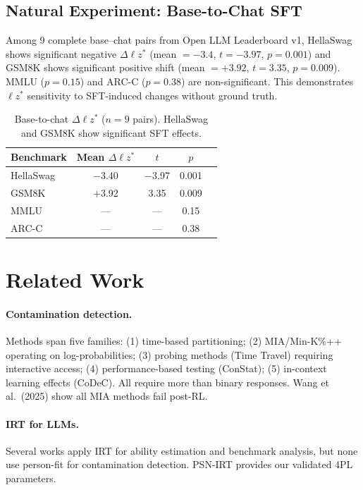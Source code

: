 \documentclass[11pt,a4paper]{article}
\begin{document}
\subsection{Natural Experiment: Base-to-Chat SFT}

Among 9 complete base--chat pairs from Open LLM Leaderboard v1, HellaSwag shows significant negative $\Delta \ell z^*$ (mean $= -3.4$, $t = -3.97$, $p = 0.001$) and GSM8K shows significant positive shift (mean $= +3.92$, $t = 3.35$, $p = 0.009$).
MMLU ($p = 0.15$) and ARC-C ($p = 0.38$) are non-significant.
This demonstrates $\ell z^*$ sensitivity to SFT-induced changes without ground truth.

\begin{table}[h]
\centering
\small
\begin{tabular}{lcccc}
\toprule
Benchmark & Mean $\Delta \ell z^*$ & $t$ & $p$ \\
\midrule
HellaSwag & $-$3.40 & $-$3.97 & 0.001 \\
GSM8K & +3.92 & 3.35 & 0.009 \\
MMLU & --- & --- & 0.15 \\
ARC-C & --- & --- & 0.38 \\
\bottomrule
\end{tabular}
\caption{Base-to-chat $\Delta \ell z^*$ ($n = 9$ pairs). HellaSwag and GSM8K show significant SFT effects.}
\label{tab:natural_exp}
\end{table}

\section{Related Work}
\label{sec:related}

\paragraph{Contamination detection.}
Methods span five families: (1) time-based partitioning; (2) MIA/Min-K\%++ operating on log-probabilities; (3) probing methods (Time Travel) requiring interactive access; (4) performance-based testing (ConStat); (5) in-context learning effects (CoDeC).
All require more than binary responses.
Wang et al.\ (2025) show all MIA methods fail post-RL.

\paragraph{IRT for LLMs.}
Several works apply IRT for ability estimation and benchmark analysis, but none use person-fit for contamination detection.
PSN-IRT provides our validated 4PL parameters.
\end{document}
